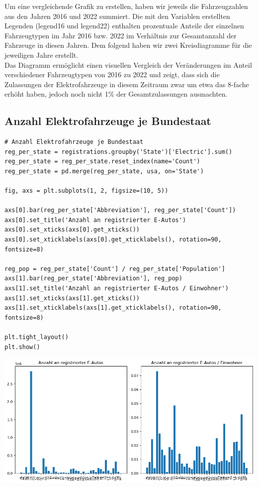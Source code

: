 Um eine vergleichende Grafik zu erstellen, haben wir jeweils die Fahrzeugzahlen aus den Jahren 2016 und 2022 summiert. Die mit den Variablen erstellten Legenden (legend16 und legend22) enthalten prozentuale Anteile der einzelnen Fahrzeugtypen im Jahr 2016 bzw. 2022 im Verhältnis zur Gesamtanzahl der Fahrzeuge in diesen Jahren. Dem folgend haben wir zwei Kreisdiagramme für die jeweiligen Jahre erstellt. \\
Das Diagramm ermöglicht einen visuellen Vergleich der Veränderungen im Anteil verschiedener Fahrzeugtypen von 2016 zu 2022 und zeigt, dass sich die Zulassungen der Elektrofahrzeuge in diesem Zeitraum zwar um etwa das 8-fache erhöht haben, jedoch noch nicht 1\% der Gesamtzulassungen ausmachten.

\subsection{Anzahl Elektrofahrzeuge je Bundestaat}

\begin{verbatim}
# Anzahl Elektrofahrzeuge je Bundestaat
reg_per_state = registrations.groupby('State')['Electric'].sum()
reg_per_state = reg_per_state.reset_index(name='Count')
reg_per_state = pd.merge(reg_per_state, usa, on='State')

fig, axs = plt.subplots(1, 2, figsize=(10, 5))

axs[0].bar(reg_per_state['Abbreviation'], reg_per_state['Count'])
axs[0].set_title('Anzahl an registrierter E-Autos')
axs[0].set_xticks(axs[0].get_xticks())
axs[0].set_xticklabels(axs[0].get_xticklabels(), rotation=90, fontsize=8)

reg_pop = reg_per_state['Count'] / reg_per_state['Population']
axs[1].bar(reg_per_state['Abbreviation'], reg_pop)
axs[1].set_title('Anzahl an registrierter E-Autos / Einwohner')
axs[1].set_xticks(axs[1].get_xticks())
axs[1].set_xticklabels(axs[1].get_xticklabels(), rotation=90, fontsize=8)

plt.tight_layout()
plt.show()
\end{verbatim}

\begin{center}
\includegraphics[scale=0.5]{img/output_2_0.png}
\end{center}

